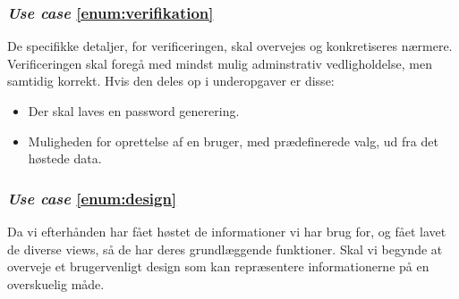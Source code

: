 \documentclass[11pt]{article}
\begin{document}
\subsubsection*{\textit{Use case} \ref{enum:verifikation}}
De specifikke detaljer, for verificeringen, skal overvejes og konkretiseres nærmere. Verificeringen skal foregå med mindst mulig adminstrativ vedligholdelse, men samtidig korrekt. Hvis den deles op i underopgaver er disse:
\begin{itemize}
	\item Der skal laves en password generering.
	\item Muligheden for oprettelse af en bruger, med prædefinerede valg, ud fra det høstede data.
\end{itemize}

\subsubsection*{\textit{Use case} \ref{enum:design}}
Da vi efterhånden har fået høstet de informationer vi har brug for, og fået lavet de diverse views, så de har deres grundlæggende funktioner. Skal vi begynde at overveje et brugervenligt design som kan repræsentere informationerne på en overskuelig måde.
\end{document}
